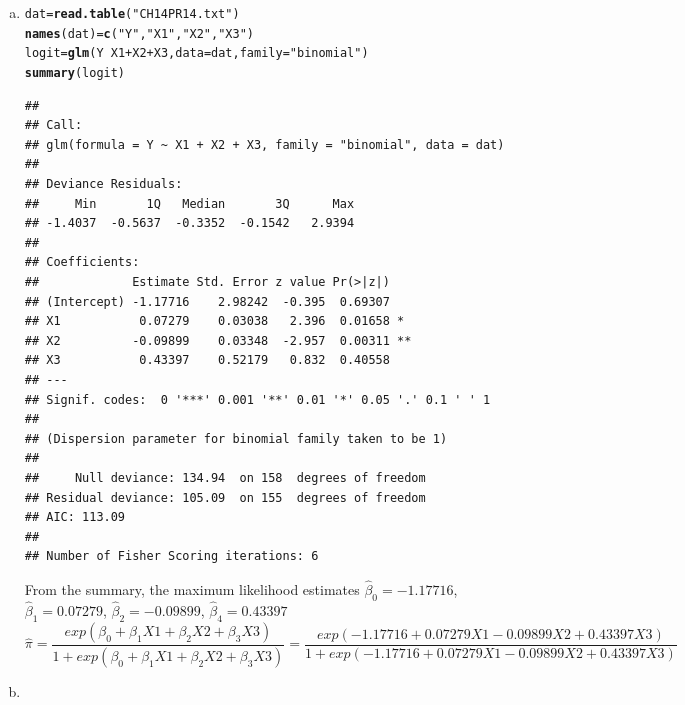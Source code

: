 \documentclass{article}\usepackage[]{graphicx}\usepackage[]{color}
\makeatletter
\newcommand{\hlstr}[1]{\textcolor[rgb]{0.192,0.494,0.8}{#1}}%
\newcommand{\hlopt}[1]{\textcolor[rgb]{0,0,0}{#1}}%
\newcommand{\hlstd}[1]{\textcolor[rgb]{0.345,0.345,0.345}{#1}}%
\newcommand{\hlkwb}[1]{\textcolor[rgb]{0.69,0.353,0.396}{#1}}%
\newcommand{\hlkwc}[1]{\textcolor[rgb]{0.333,0.667,0.333}{#1}}%
\newcommand{\hlkwd}[1]{\textcolor[rgb]{0.737,0.353,0.396}{\textbf{#1}}}%
\newenvironment{kframe}{%
 \def\at@end@of@kframe{}%
 \ifinner\ifhmode%
  \def\at@end@of@kframe{\end{minipage}}%
  \begin{minipage}{\columnwidth}%
 \fi\fi%
 \def\FrameCommand##1{\hskip\@totalleftmargin \hskip-\fboxsep
 \colorbox{shadecolor}{##1}\hskip-\fboxsep
     \hskip-\linewidth \hskip-\@totalleftmargin \hskip\columnwidth}%
 \MakeFramed {\advance\hsize-\width
   \@totalleftmargin\z@ \linewidth\hsize
   \@setminipage}}%
 {\par\unskip\endMakeFramed%
 \at@end@of@kframe}
\newenvironment{knitrout}{}{} %
\makeatother
\begin{document}
\begin{enumerate}[(a)]

\item

\begin{knitrout}
\color{fgcolor}\begin{kframe}
\begin{alltt}
  \hlstd{dat} \hlkwb{=} \hlkwd{read.table}\hlstd{(}\hlstr{"CH14PR14.txt"}\hlstd{)}
  \hlkwd{names}\hlstd{(dat)} \hlkwb{=} \hlkwd{c}\hlstd{(}\hlstr{"Y"}\hlstd{,} \hlstr{"X1"}\hlstd{,} \hlstr{"X2"}\hlstd{,} \hlstr{"X3"}\hlstd{)}
  \hlstd{logit} \hlkwb{=} \hlkwd{glm}\hlstd{(Y} \hlopt{~} \hlstd{X1} \hlopt{+} \hlstd{X2} \hlopt{+} \hlstd{X3,} \hlkwc{data} \hlstd{= dat,} \hlkwc{family} \hlstd{=} \hlstr{"binomial"}\hlstd{)}
  \hlkwd{summary}\hlstd{(logit)}
\end{alltt}
\begin{verbatim}
## 
## Call:
## glm(formula = Y ~ X1 + X2 + X3, family = "binomial", data = dat)
## 
## Deviance Residuals: 
##     Min       1Q   Median       3Q      Max  
## -1.4037  -0.5637  -0.3352  -0.1542   2.9394  
## 
## Coefficients:
##             Estimate Std. Error z value Pr(>|z|)   
## (Intercept) -1.17716    2.98242  -0.395  0.69307   
## X1           0.07279    0.03038   2.396  0.01658 * 
## X2          -0.09899    0.03348  -2.957  0.00311 **
## X3           0.43397    0.52179   0.832  0.40558   
## ---
## Signif. codes:  0 '***' 0.001 '**' 0.01 '*' 0.05 '.' 0.1 ' ' 1
## 
## (Dispersion parameter for binomial family taken to be 1)
## 
##     Null deviance: 134.94  on 158  degrees of freedom
## Residual deviance: 105.09  on 155  degrees of freedom
## AIC: 113.09
## 
## Number of Fisher Scoring iterations: 6
\end{verbatim}
\end{kframe}
\end{knitrout}

\qquad From the summary, the maximum likelihood estimates $\hat{\beta}_0 = -1.17716 $, $\hat{\beta}_1 = 0.07279$, $\hat{\beta}_2 = -0.09899 $, $\hat{\beta}_4 = 0.43397 $ $$\hat{\pi} = \frac{exp(\beta_0+\beta_1 X1 + \beta_2 X2 + \beta_3 X3)}{1+exp(\beta_0+\beta_1 X1 + \beta_2 X2 + \beta_3 X3)}=\frac{exp(-1.17716+0.07279 X1 - 0.09899 X2 +0.43397 X3)}{1+exp(-1.17716+0.07279 X1 - 0.09899 X2 +0.43397 X3)}$$

\item


\end{enumerate}
\end{document}
